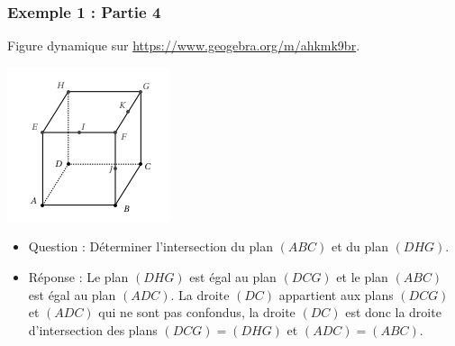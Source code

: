 \documentclass[xcolor=svgnames,t,final]{beamer}
\begin{document}
\begin{frame}

\frametitle{Exemple 1 : Partie 4}

Figure dynamique sur \href{https://www.geogebra.org/m/ahkmk9br}{https://www.geogebra.org/m/ahkmk9br}.


\begin{center}
\includegraphics[scale=0.4]{images/exemple1.png}
\end{center}

\begin{itemize}
\pause \item {\color{blue} Question : Déterminer l'intersection du plan $(ABC)$ et du plan $(DHG)$.}
\pause \item {\color{red} Réponse :  Le plan $(DHG)$ est égal au plan $(DCG)$ et le plan $(ABC)$ est égal au plan $(ADC)$. La droite $(DC)$ appartient aux plans $(DCG)$ et $(ADC)$ qui ne sont pas confondus, la droite $(DC)$ est donc la droite d'intersection des plans  $(DCG)=(DHG)$ et $(ADC)=(ABC)$.
}
\end{itemize}


\end{frame}
\end{document}
